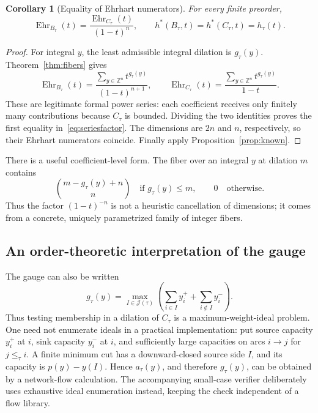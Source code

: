 \documentclass[11pt]{article}
\numberwithin{equation}{section}
\newtheorem{corollary}[theorem]{Corollary}
\theoremstyle{definition}
\newcommand{\Z}{\mathbb Z}
\newcommand{\J}{\mathcal J(\tau)}
\newcommand{\Ehr}{\operatorname{Ehr}}
\begin{document}
\begin{corollary}[Equality of Ehrhart numerators]\label{cor:numerators}
For every finite preorder,
\begin{equation}
 \Ehr_{B_\tau}(t)=\frac{\Ehr_{C_\tau}(t)}{(1-t)^n},
 \qquad h^*(B_\tau,t)=h^*(C_\tau,t)=h_\tau(t).\label{eq:seriesfactor}
\end{equation}
\end{corollary}
\begin{proof}
For integral $y$, the least admissible integral dilation is $g_\tau(y)$.
Theorem~\ref{thm:fibers} gives
\[
 \Ehr_{B_\tau}(t)
 =\frac{\displaystyle\sum_{y\in\Z^n}t^{g_\tau(y)}}{(1-t)^{n+1}},
 \qquad
 \Ehr_{C_\tau}(t)
 =\frac{\displaystyle\sum_{y\in\Z^n}t^{g_\tau(y)}}{1-t}.
\]
These are legitimate formal power series: each coefficient receives only
finitely many contributions because $C_\tau$ is bounded. Dividing the two
identities proves the first equality in~\eqref{eq:seriesfactor}. The dimensions
are $2n$ and $n$, respectively, so their Ehrhart numerators coincide. Finally
apply Proposition~\ref{prop:known}.
\end{proof}

There is a useful coefficient-level form. The fiber over an integral $y$ at
dilation $m$ contains
\begin{equation}
 \binom{m-g_\tau(y)+n}{n}\quad\text{if }g_\tau(y)\leq m,
 \qquad 0\quad\text{otherwise}.\label{eq:fibercount}
\end{equation}
Thus the factor $(1-t)^{-n}$ is not a heuristic cancellation of dimensions; it
comes from a concrete, uniquely parametrized family of integer fibers.

\subsection{An order-theoretic interpretation of the gauge}

The gauge can also be written
\begin{equation}
 g_\tau(y)=\max_{I\in\J}
 \left(\sum_{i\in I}y_i^+ +\sum_{i\notin I}y_i^-\right).\label{eq:gauge2}
\end{equation}
Thus testing membership in a dilation of $C_\tau$ is a maximum-weight-ideal
problem. One need not enumerate ideals in a practical implementation: put
source capacity $y_i^+$ at $i$, sink capacity $y_i^-$ at $i$, and sufficiently
large capacities on arcs $i\to j$ for $j\leq_\tau i$. A finite minimum cut has
a downward-closed source side $I$, and its capacity is $p(y)-y(I)$. Hence
$a_\tau(y)$, and therefore $g_\tau(y)$, can be obtained by a network-flow
calculation. The accompanying small-case verifier deliberately uses exhaustive
ideal enumeration instead, keeping the check independent of a flow library.
\end{document}
